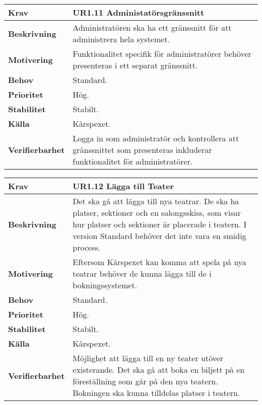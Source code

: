 \documentclass[a4paper, twoside, 11pt, titlepage]{article}
\begin{document}
		\begin{tabular} { p{2.6cm} p{12.5cm} }
			\hline
			\sffamily\textbf{Krav} & \sffamily\textbf{UR1.11 Administatörsgränssnitt  } \\
			\hline
			\sffamily\textbf{Beskrivning} & Administratören ska ha ett gränssnitt för att administrera hela systemet.  \\
			\hline
			\sffamily\textbf{Motivering} & Funktionalitet specifik för administratörer behöver presenteras i ett separat gränssnitt.  \\
			\hline
			\sffamily\textbf{Behov} & Standard.  \\
			\hline
			\sffamily\textbf{Prioritet} & Hög.  \\
			\hline
			\sffamily\textbf{Stabilitet} & Stabilt.  \\
			\hline
			\sffamily\textbf{Källa} & Kårspexet.  \\
			\hline
			\sffamily\textbf{Verifierbarhet} & Logga in som administratör och kontrollera att gränssnittet som presenteras inkluderar funktionalitet för administratörer.  \\
			\hline
		\end{tabular}
		\vspace{6mm}

		\begin{tabular} { p{2.6cm} p{12.5cm} }
			\hline
			\sffamily\textbf{Krav} & \sffamily\textbf{UR1.12 Lägga till Teater  } \\
			\hline
			\sffamily\textbf{Beskrivning} & Det ska gå att lägga till nya teatrar. De ska ha platser, sektioner och en salongsskiss, som visar hur platser och sektioner är placerade i teatern. I version Standard behöver det inte vara en smidig process.  \\
			\hline
			\sffamily\textbf{Motivering} & Eftersom Kårspexet kan komma att spela på nya teatrar behöver de kunna lägga till de i bokningssystemet.  \\
			\hline
			\sffamily\textbf{Behov} & Standard.  \\
			\hline
			\sffamily\textbf{Prioritet} & Hög.  \\
			\hline
			\sffamily\textbf{Stabilitet} & Stabilt.  \\
			\hline
			\sffamily\textbf{Källa} & Kårspexet.  \\
			\hline
			\sffamily\textbf{Verifierbarhet} & Möjlighet att lägga till en ny teater utöver existerande. Det ska gå att boka en biljett på en föreställning som går på den nya teatern. Bokningen ska kunna tilldelas platser i teatern.  \\
			\hline
		\end{tabular}
		\vspace{6mm}
\end{document}
